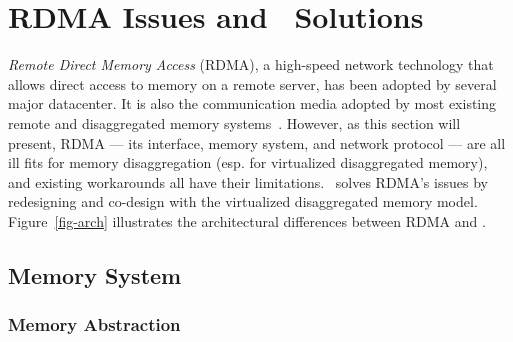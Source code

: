\section{RDMA Issues and \sys\ Solutions}

{\em Remote Direct Memory Access} (RDMA), a high-speed network technology that allows direct access to memory on a remote server,
has been adopted by several major datacenter\cite{AZURE-RDMA,ALIBABA-RDMA}.
It is also the communication media adopted by most existing remote and disaggregated memory systems~\cite{XXX}. 
However, as this section will present, RDMA --- its interface, memory system, and network protocol --- 
are all ill fits for memory disaggregation (esp. for virtualized disaggregated memory),
and existing workarounds all have their limitations.
\sys\ solves RDMA's issues by redesigning and co-design with the virtualized disaggregated memory model.
Figure~\ref{fig-arch} illustrates the architectural differences between RDMA and \sys.


\subsection{Memory System} 
\label{sec:memory}

\subsubsection{Memory Abstraction}
\label{sec:abstraction}

